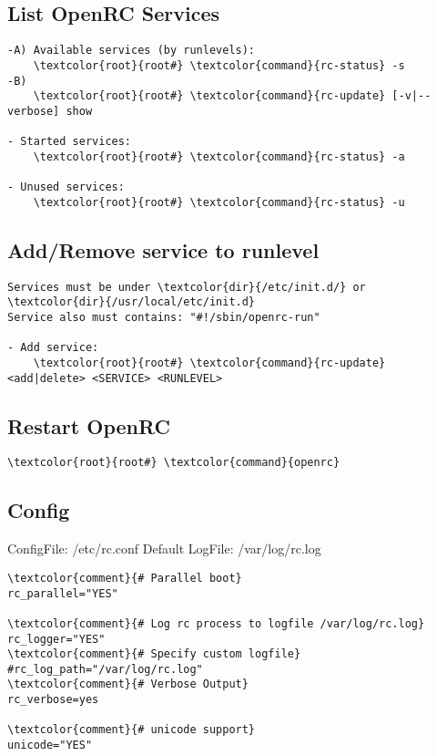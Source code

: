 \documentclass[10pt, a4paper, onecolumn, openany]{book}         %
\begin{document}
\subsection{List OpenRC Services}
\begin{Verbatim}[commandchars=\\\{\}]
-A) Available services (by runlevels):
    \textcolor{root}{root#} \textcolor{command}{rc-status} -s
-B)
    \textcolor{root}{root#} \textcolor{command}{rc-update} [-v|--verbose] show
    
- Started services:
    \textcolor{root}{root#} \textcolor{command}{rc-status} -a
    
- Unused services:
    \textcolor{root}{root#} \textcolor{command}{rc-status} -u
\end{Verbatim}

\subsection{Add/Remove service to runlevel}
\begin{Verbatim}[commandchars=\\\{\}]
Services must be under \textcolor{dir}{/etc/init.d/} or \textcolor{dir}{/usr/local/etc/init.d}
Service also must contains: "#!/sbin/openrc-run"

- Add service:
    \textcolor{root}{root#} \textcolor{command}{rc-update} <add|delete> <SERVICE> <RUNLEVEL>
\end{Verbatim}

\subsection{Restart OpenRC}
\begin{Verbatim}[commandchars=\\\{\}]
    \textcolor{root}{root#} \textcolor{command}{openrc}
\end{Verbatim}

\subsection{Config}
ConfigFile: \textcolor{file}{/etc/rc.conf}\newline
Default LogFile: \textcolor{file}{/var/log/rc.log}
\begin{Verbatim}[commandchars=\\\{\}]
\textcolor{comment}{# Parallel boot}
rc_parallel="YES"

\textcolor{comment}{# Log rc process to logfile /var/log/rc.log}
rc_logger="YES"
\textcolor{comment}{# Specify custom logfile}
#rc_log_path="/var/log/rc.log"
\textcolor{comment}{# Verbose Output}
rc_verbose=yes

\textcolor{comment}{# unicode support}
unicode="YES"
\end{Verbatim}
\end{document}

